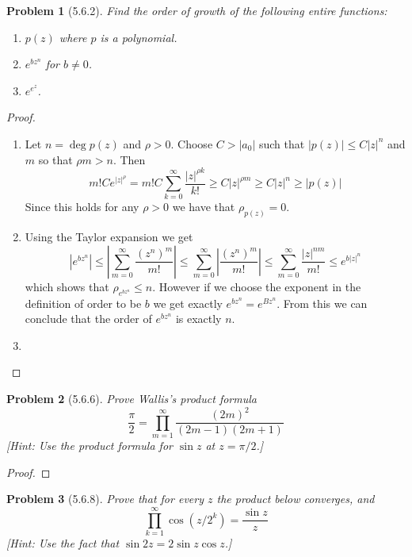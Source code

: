 \documentclass[10pt]{article}
\newcommand{\sk}{\vskip 10mm}
\theoremstyle{plain}
\newtheorem{problem}{Problem}
\theoremstyle{remark}
\begin{document}
\begin{problem}[5.6.2]
  Find the order of growth of the following entire functions:
  \begin{enumerate}
  \item[(a)] $p(z)$ where $p$ is a polynomial.
  \item[(b)] $e^{bz^n}$ for $b\neq 0$.
  \item[(c)] $e^{e^z}$.
  \end{enumerate}
\end{problem}

\begin{proof}
  \begin{enumerate}
  \item[(a)] Let $n=\deg p(z)$ and $\rho>0$. Choose $C>|a_0|$ such that $|p(z)|\leq C|z|^n$
    and $m$ so that $\rho m>n$. Then
    \[
      m!Ce^{|z|^\rho}=m!C\sum_{k=0}^\infty\frac{|z|^{\rho k}}{k!}\geq C|z|^{\rho m}\geq C|z|^n\geq|p(z)|
    \]
    Since this holds for any $\rho>0$ we have that $\rho_{p(z)}=0$.
  \item[(b)] Using the Taylor expansion we get
    \[
      |e^{bz^n}|\leq|\sum_{m=0}^\infty\frac{(z^n)^m}{m!}|\leq\sum_{m=0}^\infty|\frac{(z^n)^m}{m!}|\leq\sum_{m=0}^\infty\frac{|z|^{nm}}{m!}\leq e^{b|z|^n}
    \]
    which shows that $\rho_{e^{bz^n}}\leq n$. However if we choose the exponent in the
    definition of order to be $b$ we get exactly $e^{bz^n}=e^{Bz^n}$. From this
    we can conclude that the order of $e^{bz^n}$ is exactly $n$.

  \item[(c)]
  \end{enumerate}
\end{proof}

\sk

\begin{problem}[5.6.6]
  Prove Wallis's product formula
  \[
    \frac{\pi}{2}=\prod_{m=1}^\infty\frac{(2m)^2}{(2m-1)(2m+1)}
  \]
  [Hint: Use the product formula for $\sin z$ at $z=\pi/2$.]
\end{problem}

\begin{proof}
  
\end{proof}

\sk

\begin{problem}[5.6.8]
  Prove that for every $z$ the product below converges, and
  \[
    \prod_{k=1}^\infty \cos(z/2^k)=\frac{\sin z}{z}
  \]
  [Hint: Use the fact that $\sin 2z=2\sin z\cos z$.]
\end{problem}
\end{document}
